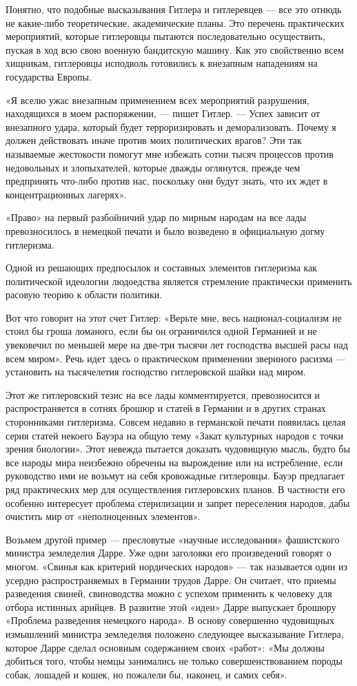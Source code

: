 \documentclass[12pt, a4paper, openany]{book}
\begin{document}
Понятно, что подобные высказывания Гитлера и гитлеревцев — все это отнюдь не какие-либо теоретические, академические планы. Это перечень практических мероприятий, которые гитлеровцы пытаются последовательно осуществить, пуская в ход всю свою военную бандитскую машину. Как это свойственно всем хищникам, гитлеровцы исподволь готовились к внезапным нападениям на государства Европы.

«Я вселю ужас внезапным применением всех мероприятий разрушения, находящихся в моем распоряжении, — пишет Гитлер. — Успех зависит от внезапного удара, который будет терроризировать и деморализовать. Почему я должен действовать иначе против моих политических врагов? Эти так называемые жестокости помогут мне избежать сотни тысяч процессов против недовольных и злопыхателей, которые дважды оглянутся, прежде чем предпринять что-либо против нас, поскольку они будут знать, что их ждет в концентрационных лагерях».

«Право» на первый разбойничий удар по мирным народам на все лады превозносилось в немецкой печати и было возведено в официальную догму гитлеризма.

Одной из решающих предпосылок и составных элементов гитлеризма как политической идеологии людоедства является стремление практически применить расовую теорию к области политики.

Вот что говорит на этот счет Гитлер: «Верьте мне, весь национал-социализм не стоил бы гроша ломаного, если бы он ограничился одной Германией и не увековечил по меньшей мере на две-три тысячи лет господства высшей расы над всем миром». Речь идет здесь о практическом применении звериного расизма — установить на тысячелетия господство гитлеровской шайки над миром.

Этот же гитлеровский тезис на все лады комментируется, превозносится и распространяется в сотнях брошюр и статей в Германии и в других странах сторонниками гитлеризма. Совсем недавно в германской печати появилась целая серия статей некоего Бауэра на общую тему «Закат культурных народов с точки зрения биологии». Этот невежда пытается доказать чудовищную мысль, будто бы все народы мира неизбежно обречены на вырождение или на истребление, если руководство ими не возьмут на себя кровожадные гитлеровцы. Бауэр предлагает ряд практических мер для осуществления гитлеровских планов. В частности его особенно интересует проблема стерилизации и запрет переселения народов, дабы очистить мир от «неполноценных элементов».

Возьмем другой пример — пресловутые «научные исследования» фашистского министра земледелия Дарре. Уже одни заголовки его произведений говорят о многом. «Свинья как критерий нордических народов» — так называется один из усердно распространяемых в Германии трудов Дарре. Он считает, что приемы разведения свиней, свиноводства можно с успехом применить к человеку для отбора истинных арийцев. В развитие этой «идеи» Дарре выпускает брошюру «Проблема разведения немецкого народа». В основу совершенно чудовищных измышлений министра земледелия положено следующее высказывание Гитлера, которое Дарре сделал основным содержанием своих «работ»: «Мы должны добиться того, чтобы немцы занимались не только совершенствованием породы собак, лошадей и кошек, но пожалели бы, наконец, и самих себя».
\end{document}
